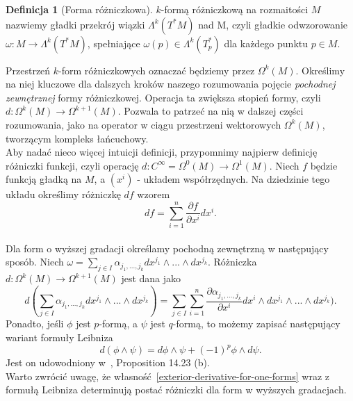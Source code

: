 \documentclass[licencjacka]{pracamgr}
\theoremstyle{definition}
\newtheorem{definition}{Definicja}[section]
\theoremstyle{definition}
\theoremstyle{plain}
\theoremstyle{plain}
\theoremstyle{plain}
\theoremstyle{plain}
\begin{document}
\begin{definition}[Forma różniczkowa]
  $k$-formą różniczkową na rozmaitości $M$ nazwiemy gładki przekrój wiązki
  $\Lambda^k(T^\ast M)$ nad M, czyli gładkie odwzorowanie $\omega: M \rightarrow
  \Lambda^k (T^\ast M)$, spełniające $\omega(p) \in \Lambda^k(T_p^\ast)$ dla
  każdego punktu $p \in M$.
\end{definition}

Przestrzeń $k$-form różniczkowych oznaczać będziemy przez $\Omega^k(M)$. 
Określimy na niej kluczowe dla dalszych kroków naszego rozumowania pojęcie
\emph{pochodnej zewnętrznej} formy różniczkowej. Operacja ta zwiększa stopień
formy, czyli $d: \Omega^k(M) \rightarrow \Omega^{k+1} (M)$. Pozwala to patrzeć
na nią w dalszej części rozumowania, jako na operator w ciągu przestrzeni
wektorowych $\Omega^k(M)$, tworzącym kompleks łańcuchowy. \\

Aby nadać nieco więcej intuicji definicji, przypomnimy najpierw
definicję różniczki funkcji, czyli operację 
$d: C^\infty = \Omega^0(M) \rightarrow \Omega^1(M)$. Niech $f$ będzie funkcją
gładką na $M$, a $(x^i)$ -  układem współrzędnych. Na dziedzinie tego układu
określimy różniczkę $df$ wzorem
\begin{equation}\label{exterior-derivative-for-one-forms}
df = \sum_{i=1}^n \frac{\partial f}{\partial x^i} dx^i.
\end{equation} \\

Dla form o wyższej gradacji określamy pochodną zewnętrzną w następujący
sposób. Niech 
$\omega = \sum_{j \in I} \alpha_{j_1, ..., j_k} dx^{j_1} \wedge ... \wedge dx^{j_k}$.
Różniczka $d: \Omega^k(M) \rightarrow \Omega^{k+1}(M)$ jest dana jako
\[ %
d( \sum_{j \in I} \alpha_{j_1, ..., j_k} dx^{j_1} \wedge ... \wedge dx^{j_k}) = 
 \sum_{j \in I} \sum_{i=1}^n
 \frac{ \partial \alpha_{j_1, ..., j_k}} {\partial x^i} dx^i
                            \wedge dx^{j_1} \wedge ... \wedge dx^{j_k}).
\]
Ponadto, jeśli $\phi$ jest $p$-formą, a $\psi$ jest $q$-formą, to możemy
zapisać następujący wariant formuły Leibniza
\[
d(\phi \wedge \psi) = d\phi \wedge \psi + (-1)^p \phi \wedge d\psi.
\]
Jest on udowodniony w~\cite{lee}, Proposition 14.23 (b). \\

Warto zwrócić uwagę, że własność~\ref{exterior-derivative-for-one-forms} wraz z
formułą Leibniza determinują postać różniczki dla form w wyższych gradacjach. \\
\end{document}
